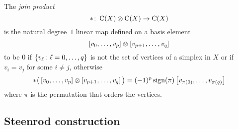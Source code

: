 The \textit{join product}
\[
\ast \colon \operatorname{C}(X) \otimes \operatorname{C}(X) \to \operatorname{C}(X)
\]
is the natural degree~$1$ linear map defined on a basis element
\[
[v_0, \dots, v_p] \otimes [v_{p+1}, \dots, v_q]
\]
to be $0$ if $\{v_\ell : \ell = 0, \dots, q\}$ is not the set of vertices of a simplex in $X$ or if $v_i = v_j$ for some $i \neq j$,
otherwise
\[
\ast \big(\left[v_0, \dots, v_p \right] \otimes \left[v_{p+1}, \dots, v_q\right]\big) =
(-1)^{p} \operatorname{sign}(\pi) \left[v_{\pi(0)}, \dots, v_{\pi(q)}\right]
\]
where $\pi$ is the permutation that orders the vertices.

%	

\subsection{Steenrod construction}\label{ss:cup-i}

